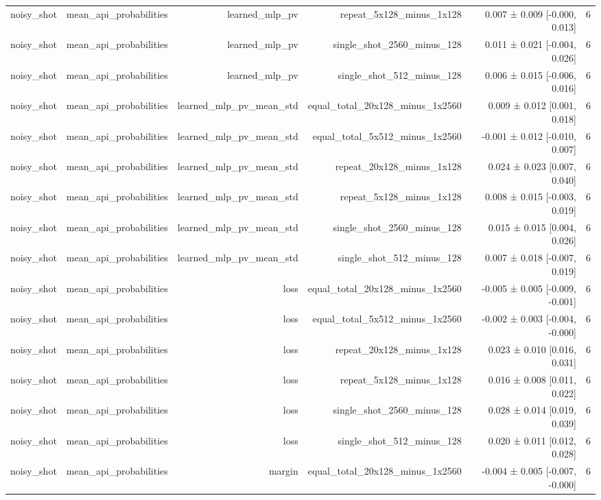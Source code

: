 \begin{table}
\begin{tabular}{lrrrrr}
noisy\_shot & mean\_api\_probabilities & learned\_mlp\_pv & repeat\_5x128\_minus\_1x128 & 0.007 ± 0.009 [-0.000, 0.013] & 6 \\
noisy\_shot & mean\_api\_probabilities & learned\_mlp\_pv & single\_shot\_2560\_minus\_128 & 0.011 ± 0.021 [-0.004, 0.026] & 6 \\
noisy\_shot & mean\_api\_probabilities & learned\_mlp\_pv & single\_shot\_512\_minus\_128 & 0.006 ± 0.015 [-0.006, 0.016] & 6 \\
noisy\_shot & mean\_api\_probabilities & learned\_mlp\_pv\_mean\_std & equal\_total\_20x128\_minus\_1x2560 & 0.009 ± 0.012 [0.001, 0.018] & 6 \\
noisy\_shot & mean\_api\_probabilities & learned\_mlp\_pv\_mean\_std & equal\_total\_5x512\_minus\_1x2560 & -0.001 ± 0.012 [-0.010, 0.007] & 6 \\
noisy\_shot & mean\_api\_probabilities & learned\_mlp\_pv\_mean\_std & repeat\_20x128\_minus\_1x128 & 0.024 ± 0.023 [0.007, 0.040] & 6 \\
noisy\_shot & mean\_api\_probabilities & learned\_mlp\_pv\_mean\_std & repeat\_5x128\_minus\_1x128 & 0.008 ± 0.015 [-0.003, 0.019] & 6 \\
noisy\_shot & mean\_api\_probabilities & learned\_mlp\_pv\_mean\_std & single\_shot\_2560\_minus\_128 & 0.015 ± 0.015 [0.004, 0.026] & 6 \\
noisy\_shot & mean\_api\_probabilities & learned\_mlp\_pv\_mean\_std & single\_shot\_512\_minus\_128 & 0.007 ± 0.018 [-0.007, 0.019] & 6 \\
noisy\_shot & mean\_api\_probabilities & loss & equal\_total\_20x128\_minus\_1x2560 & -0.005 ± 0.005 [-0.009, -0.001] & 6 \\
noisy\_shot & mean\_api\_probabilities & loss & equal\_total\_5x512\_minus\_1x2560 & -0.002 ± 0.003 [-0.004, -0.000] & 6 \\
noisy\_shot & mean\_api\_probabilities & loss & repeat\_20x128\_minus\_1x128 & 0.023 ± 0.010 [0.016, 0.031] & 6 \\
noisy\_shot & mean\_api\_probabilities & loss & repeat\_5x128\_minus\_1x128 & 0.016 ± 0.008 [0.011, 0.022] & 6 \\
noisy\_shot & mean\_api\_probabilities & loss & single\_shot\_2560\_minus\_128 & 0.028 ± 0.014 [0.019, 0.039] & 6 \\
noisy\_shot & mean\_api\_probabilities & loss & single\_shot\_512\_minus\_128 & 0.020 ± 0.011 [0.012, 0.028] & 6 \\
noisy\_shot & mean\_api\_probabilities & margin & equal\_total\_20x128\_minus\_1x2560 & -0.004 ± 0.005 [-0.007, -0.000] & 6 \\

\end{tabular}
\end{table}

